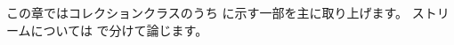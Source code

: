 \documentclass[a4paper,10pt,twoside]{book}
\begin{document}


この章ではコレクションクラスのうち  に示す一部を主に取り上げます。
ストリームについては  で分けて論じます。

\end{document}
